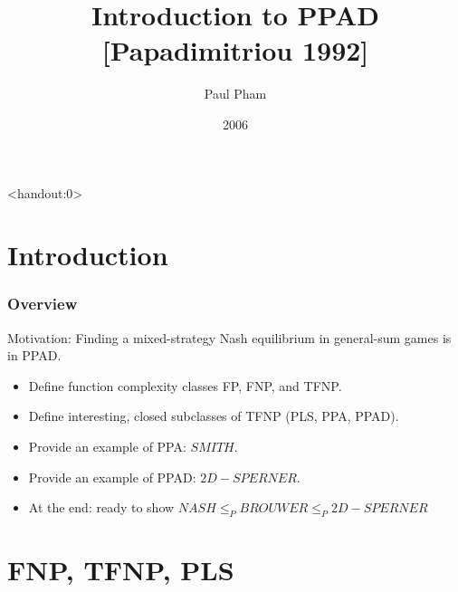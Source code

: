 \documentclass[10pt]{beamer}
\title{Introduction to PPAD [Papadimitriou 1992]}
\author[P. Pham]{Paul Pham}
\institute{UW CSE}
\date{2006}
\begin{document}
\begin{frame}<handout:0>
\titlepage
\end{frame}

\section{Introduction}

\begin{frame}
\frametitle{Overview}

Motivation:
Finding a mixed-strategy Nash equilibrium in general-sum games is in PPAD.

\begin{itemize}
\item Define function complexity classes FP, FNP, and TFNP.
\item Define interesting, closed subclasses of TFNP (PLS, PPA, PPAD).
\item Provide an example of PPA: $SMITH$.
\item Provide an example of PPAD: $2D-SPERNER$.
\item At the end: ready to show $NASH \le_P BROUWER \le_P 2D-SPERNER$
\end{itemize}

\end{frame}

\section{FNP, TFNP, PLS}
\end{document}
